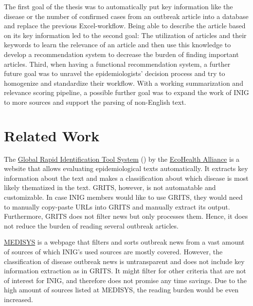   The first goal of the thesis was to automatically put key information like the disease or the number of confirmed cases from an outbreak article into a database and replace the previous Excel-workflow.
  Being able to describe the article based on its key information led to the second goal: The utilization of articles and their keywords to learn the relevance of an article and then use this knowledge to develop a recommendation system to decrease the burden of finding important articles.
  Third, when having a functional recommendation system, a further future goal was to unravel the epidemiologists' decision process and try to homogenize and standardize their workflow.
  With a working summarization and relevance scoring pipeline, a possible further goal was to expand the work of INIG to more sources and support the parsing of non-English text.


\section{Related Work}
  The \href{https://grits.eha.io}{Global Rapid Identification Tool System} () by the \href{https://www.ecohealthalliance.org}{EcoHealth Alliance} is a website that allows evaluating epidemiological texts automatically.
  It extracts key information about the text and makes a classification about which disease is most likely thematized in the text.
  GRITS, however, is not automatable and customizable.
  In case INIG members would like to use GRITS, they would need to manually copy-paste URLs into GRITS and manually extract its output.
  Furthermore, GRITS does not filter news but only processes them.
  Hence, it does not reduce the burden of reading several outbreak articles.

  \href{http://medisys.newsbrief.eu}{MEDISYS} is a webpage that filters and sorts outbreak news from a vast amount of sources of which INIG's used sources are mostly covered.
  However, the classification of disease outbreak news is untransparent and does not include key information extraction as in GRITS.
  It might filter for other criteria that are not of interest for INIG, and therefore does not promise any time savings.
  Due to the high amount of sources listed at MEDISYS, the reading burden would be even increased.
